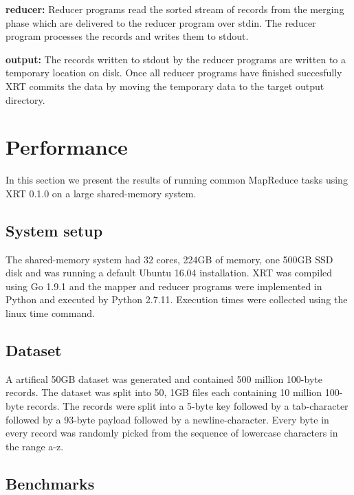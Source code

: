 \documentclass[twocolumn,11px]{article}       %
\begin{document}
\bigskip
\noindent
\textbf{reducer:} Reducer programs read the sorted stream of records from the merging phase which are delivered to the reducer program over stdin.
The reducer program processes the records and writes them to stdout.

\bigskip
\noindent
\textbf{output:} The records written to stdout by the reducer programs are written to a temporary location on disk.
Once all reducer programs have finished succesfully XRT commits the data by moving the temporary data to the target output directory.

\section{Performance} \label{sec:perf}

In this section we present the results of running common MapReduce tasks using XRT 0.1.0 on a large shared-memory system.

\subsection{System setup}

The shared-memory system had 32 cores, 224GB of memory, one 500GB SSD disk and was running a default Ubuntu 16.04 installation.
XRT was compiled using Go 1.9.1 and the mapper and reducer programs were implemented in Python and executed by Python 2.7.11.
Execution times were collected using the linux time command.

\subsection{Dataset}

A artifical 50GB dataset was generated and contained 500 million 100-byte records.
The dataset was split into 50, 1GB files each containing 10 million 100-byte records.
The records were split into a 5-byte key followed by a tab-character followed by a 93-byte payload followed by a newline-character.
Every byte in every record was randomly picked from the sequence of lowercase characters in the range a-z.

\subsection{Benchmarks}
\end{document}
